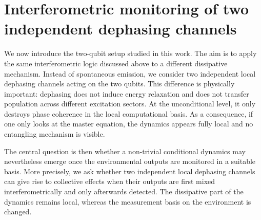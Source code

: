 \section{Interferometric monitoring of two independent dephasing channels}
\label{sec:results_N2_interferometric_scheme}

We now introduce the two-qubit setup studied in this work. The aim is to apply the same interferometric logic discussed above to a different dissipative mechanism. Instead of spontaneous emission, we consider two independent local dephasing channels acting on the two qubits. This difference is physically important: dephasing does not induce energy relaxation and does not transfer population across different excitation sectors. At the unconditional level, it only destroys phase coherence in the local computational basis. As a consequence, if one only looks at the master equation, the dynamics appears fully local and no entangling mechanism is visible.

The central question is then whether a non-trivial conditional dynamics may nevertheless emerge once the environmental outputs are monitored in a suitable basis. More precisely, we ask whether two independent local dephasing channels can give rise to collective effects when their outputs are first mixed interferometrically and only afterwards detected. The dissipative part of the dynamics remains local, whereas the measurement basis on the environment is changed.

